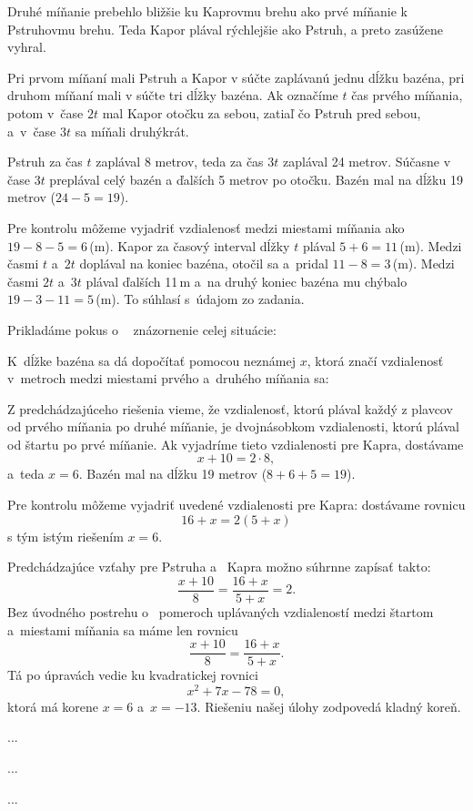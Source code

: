 {%
Druhé míňanie prebehlo bližšie ku Kaprovmu brehu ako prvé míňanie k Pstruhovmu brehu.
Teda Kapor plával rýchlejšie ako Pstruh, a preto zasúžene vyhral.

Pri prvom míňaní mali Pstruh a Kapor v súčte zaplávanú jednu dĺžku bazéna, pri druhom míňaní mali v súčte tri dĺžky bazéna.
Ak označíme $t$ čas prvého míňania, potom v~čase $2t$ mal Kapor otočku za sebou, zatiaľ čo Pstruh pred sebou, a~v~čase $3t$ sa míňali druhýkrát.

Pstruh za čas $t$ zaplával 8 metrov, teda za čas $3t$ zaplával 24 metrov.
Súčasne v čase $3t$ preplával celý bazén a ďalších 5 metrov po otočku.
Bazén mal na dĺžku 19 metrov ($24-5=19$).

\poznamky
Pre kontrolu môžeme vyjadriť vzdialenosť medzi miestami míňania ako $19-8-5 =6$\,(m).
Kapor za časový interval dĺžky $t$ plával $5+6=11$\,(m).
Medzi časmi $t$ a~$2t$ doplával na koniec bazéna, otočil sa a~pridal $11-8=3$\,(m).
Medzi časmi $2t$ a~$3t$ plával ďalších 11\,m a~na druhý koniec bazéna mu chýbalo $19-3-11=5$\,(m).
To súhlasí s~údajom zo zadania.

Prikladáme pokus o ~ znázornenie celej situácie:
%

\ineriesenie
K~dĺžke bazéna sa dá dopočítať pomocou neznámej $x$, ktorá značí vzdialenosť v~metroch medzi miestami prvého a~druhého míňania sa:

Z predchádzajúceho riešenia vieme, že vzdialenosť, ktorú plával každý z plavcov od prvého míňania po druhé míňanie, je dvojnásobkom vzdialenosti, ktorú plával od štartu po prvé míňanie.
Ak vyjadríme tieto vzdialenosti pre Kapra, dostávame
$$
x+10 =2\cdot8,
$$
a~teda $x=6$.
Bazén mal na dĺžku 19 metrov ($8+6+5 =19$).

\poznamky
Pre kontrolu môžeme vyjadriť uvedené vzdialenosti pre Kapra:
dostávame rovnicu
$$
16+x =2(5+x)
$$
s tým istým riešením $x=6$.

Predchádzajúce vzťahy pre Pstruha a ~Kapra možno súhrnne zapísať takto:
$$
\frac{x+10}8 =\frac{16+x}{5+x} =2 .
$$
Bez úvodného postrehu o ~pomeroch uplávaných vzdialeností medzi štartom a~miestami míňania sa máme len rovnicu
$$
\frac{x+10}8 =\frac{16+x}{5+x} .
$$
Tá po úpravách vedie ku kvadratickej rovnici
$$
x^2 +7x -78 =0,
$$
ktorá má korene $x=6$ a~$x=-13$.
Riešeniu našej úlohy zodpovedá kladný koreň.
}

{%
...}

{%
...}

{%
...}

